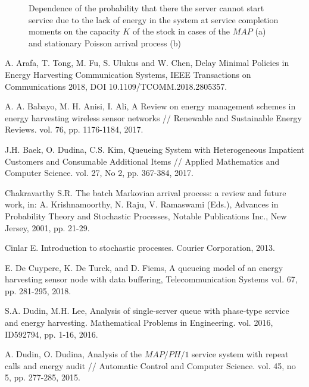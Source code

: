 \documentclass[12pt, a4paper]{article}
\begin{document}
\begin{figure}[h]
\begin{minipage}[h]{0.49\linewidth}
\end{minipage}
\caption{Dependence of the probability that there the server cannot start service due to the lack of energy in the system at service completion moments on the capacity $K$ of the stock
in cases of the $MAP$ (a) and stationary Poisson arrival process (b)}
\end{figure}



%
%
% 
% 
%
\begin{thebibliography}{8}

A. Arafa, T. Tong, M. Fu, S. Ulukus and W. Chen,   Delay Minimal Policies in Energy Harvesting Communication Systems, IEEE Transactions on Communications 2018, DOI 10.1109/TCOMM.2018.2805357.

 A. A. Babayo,  M. H. Anisi,  I.  Ali,  A Review on energy management schemes in energy harvesting wireless sensor networks // Renewable and Sustainable Energy Reviews. vol.  76, pp. 1176-1184, 2017.

 J.H. Baek, O. Dudina, C.S. Kim,   Queueing System with Heterogeneous Impatient Customers and Consumable Additional Items //     Applied Mathematics and Computer Science. vol. 27, No 2, pp. 367-384, 2017.



Chakravarthy S.R. The batch Markovian arrival process: a
review and future work, in: A. Krishnamoorthy, N. Raju, V. Ramaswami (Eds.), {Advances in Probability Theory and Stochastic
Processes},   Notable Publications Inc., New Jersey, 2001, pp. 21-29.

Cinlar E. Introduction to stochastic processes. Courier Corporation, 2013.

 E. De Cuypere,  K. De Turck, and D. Fiems, A queueing model of an energy harvesting sensor node with data buffering, Telecommunication Systems vol. 67, pp.  281-295, 2018.

 S.A. Dudin,  M.H. Lee,  Analysis of single-server queue with phase-type service and energy harvesting. Mathematical Problems in Engineering.  vol. 2016, ID592794, pp. 1-16, 2016.

 A. Dudin,    O. Dudina, Analysis of the $MAP/PH/1$ service system with repeat calls and energy audit // Automatic Control and Computer Science.  vol. 45, no 5, pp. 277-285, 2015.


\end{thebibliography}
\end{document}
